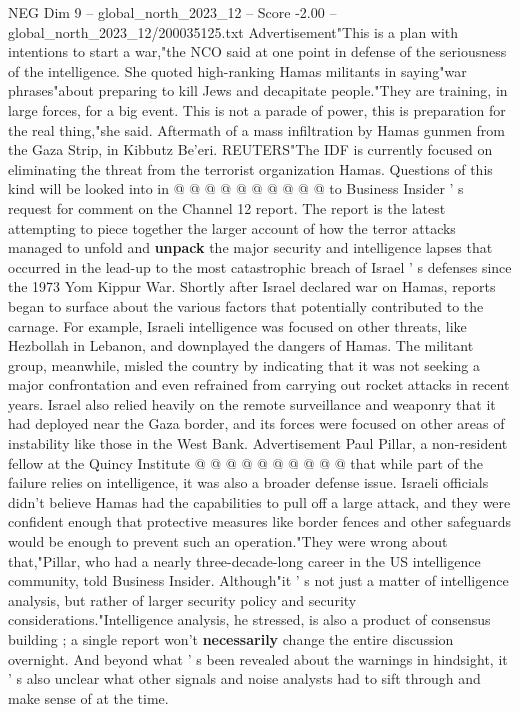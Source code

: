 \begin{textsample}{NEG Dim 9 – global\_north\_2023\_12 – Score -2.00 – global\_north\_2023\_12/200035125.txt}
Advertisement"This is a plan with intentions to start a war,"the NCO said at one point in defense of the seriousness of the intelligence.
She quoted high-ranking Hamas militants in saying"war phrases"about preparing to kill Jews and decapitate people."They are training, in large forces, for a big event.
This is not a parade of power, this is preparation for the real thing,"she said.
Aftermath of a mass infiltration by Hamas gunmen from the Gaza Strip, in Kibbutz Be'eri.
REUTERS"The IDF is currently focused on eliminating the threat from the terrorist organization Hamas.
Questions of this kind will be looked into in @ @ @ @ @ @ @ @ @ @ to Business Insider ' s request for comment on the Channel 12 report.
The report is the latest attempting to piece together the larger account of how the terror attacks managed to unfold and \textbf{unpack} the major security and intelligence lapses that occurred in the lead-up to the most catastrophic breach of Israel ' s defenses since the 1973 Yom Kippur War.
Shortly after Israel declared war on Hamas, reports began to surface about the various factors that potentially contributed to the carnage.
For example, Israeli intelligence was focused on other threats, like Hezbollah in Lebanon, and downplayed the dangers of Hamas.
The militant group, meanwhile, misled the country by indicating that it was not seeking a major confrontation and even refrained from carrying out rocket attacks in recent years.
Israel also relied heavily on the remote surveillance and weaponry that it had deployed near the Gaza border, and its forces were focused on other areas of instability like those in the West Bank.
Advertisement Paul Pillar, a non-resident fellow at the Quincy Institute @ @ @ @ @ @ @ @ @ @ that while part of the failure relies on intelligence, it was also a broader defense issue.
Israeli officials didn't believe Hamas had the capabilities to pull off a large attack, and they were confident enough that protective measures like border fences and other safeguards would be enough to prevent such an operation."They were wrong about that,"Pillar, who had a nearly three-decade-long career in the US intelligence community, told Business Insider.
Although"it ' s not just a matter of intelligence analysis, but rather of larger security policy and security considerations."Intelligence analysis, he stressed, is also a product of consensus building ; a single report won't \textbf{necessarily} change the entire discussion overnight.
And beyond what ' s been revealed about the warnings in hindsight, it ' s also unclear what other signals and noise analysts had to sift through and make sense of at the time.

\end{textsample}

